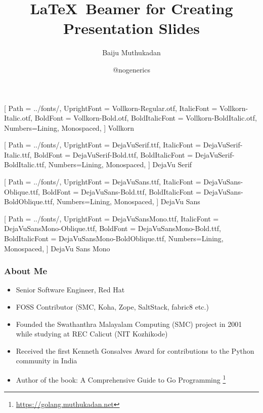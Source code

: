 \documentclass[aspectratio=169]{beamer}
\title{\LaTeX\ Beamer for Creating Presentation Slides}
\author{Baiju Muthukadan}
\institute{Red Hat}
\date{@nogenerics}
\begin{document}
\beamertemplatenavigationsymbolsempty

\setmainfont
[ Path = ../fonts/,
UprightFont = DejaVuSerif.ttf,
ItalicFont = DejaVuSerif-Italic.ttf,
BoldFont = DejaVuSerif-Bold.ttf,
BoldItalicFont = DejaVuSerif-BoldItalic.ttf,
Numbers={Lining, Monospaced},
] {DejaVu Serif}

\setsansfont
[ Path = ../fonts/,
UprightFont = DejaVuSans.ttf,
ItalicFont = DejaVuSans-Oblique.ttf,
BoldFont = DejaVuSans-Bold.ttf,
BoldItalicFont = DejaVuSans-BoldOblique.ttf,
Numbers={Lining, Monospaced},
] {DejaVu Sans}

\setmonofont
[ Path = ../fonts/,
UprightFont = DejaVuSansMono.ttf,
ItalicFont = DejaVuSansMono-Oblique.ttf,
BoldFont = DejaVuSansMono-Bold.ttf,
BoldItalicFont = DejaVuSansMono-BoldOblique.ttf,
Numbers={Lining, Monospaced},
] {DejaVu Sans Mono}


\newfontfamily{\vollkorn}
[ Path = ../fonts/,
UprightFont = Vollkorn-Regular.otf,
ItalicFont = Vollkorn-Italic.otf,
BoldFont = Vollkorn-Bold.otf,
BoldItalicFont = Vollkorn-BoldItalic.otf,
Numbers={Lining, Monospaced},
] {Vollkorn}

\newfontfamily{\dejavuserif}
[ Path = ../fonts/,
UprightFont = DejaVuSerif.ttf,
ItalicFont = DejaVuSerif-Italic.ttf,
BoldFont = DejaVuSerif-Bold.ttf,
BoldItalicFont = DejaVuSerif-BoldItalic.ttf,
Numbers={Lining, Monospaced},
] {DejaVu Serif}

\newfontfamily{\dejavusans}
[ Path = ../fonts/,
UprightFont = DejaVuSans.ttf,
ItalicFont = DejaVuSans-Oblique.ttf,
BoldFont = DejaVuSans-Bold.ttf,
BoldItalicFont = DejaVuSans-BoldOblique.ttf,
Numbers={Lining, Monospaced},
] {DejaVu Sans}

\newfontfamily{\dejavumono}
[ Path = ../fonts/,
UprightFont = DejaVuSansMono.ttf,
ItalicFont = DejaVuSansMono-Oblique.ttf,
BoldFont = DejaVuSansMono-Bold.ttf,
BoldItalicFont = DejaVuSansMono-BoldOblique.ttf,
Numbers={Lining, Monospaced},
] {DejaVu Sans Mono}

\frame{\titlepage}

\begin{frame}
  \frametitle{About Me}

  \begin{itemize}
  \item<1-> Senior Software Engineer, Red Hat
  \item<2-> FOSS Contributor (SMC, Koha, Zope, SaltStack, fabric8 etc.)
  \item<3-> Founded the Swathanthra Malayalam Computing (SMC) project in 2001 while studying at REC Calicut (NIT Kozhikode)
  \item<4-> Received the first Kenneth Gonsalves Award for contributions to the Python community in India
  \item<5-> Author of the book: A Comprehensive Guide to Go Programming \footnote{\url{https://golang.muthukadan.net}}
  \end{itemize}

\end{frame}
\end{document}
